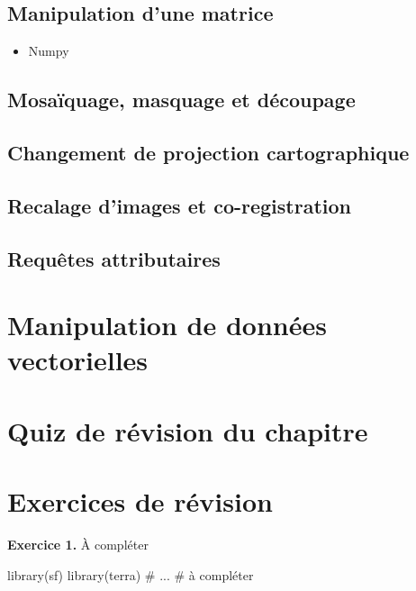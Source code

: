 \documentclass[
  letterpaper,
  DIV=11,
  numbers=noendperiod]{scrreprt}
\newenvironment{Shaded}{\begin{snugshade}}{\end{snugshade}}
\newcommand{\CommentTok}[1]{\textcolor[rgb]{0.37,0.37,0.37}{#1}}
\newcommand{\NormalTok}[1]{\textcolor[rgb]{0.00,0.23,0.31}{#1}}
\providecommand{\tightlist}{%
  \setlength{\itemsep}{0pt}\setlength{\parskip}{0pt}}\usepackage{longtable,booktabs,array}
\begin{document}
\subsection{Manipulation d'une matrice}\label{sec-0131}

\begin{itemize}
\tightlist
\item
  Numpy
\end{itemize}

\subsection{Mosaïquage, masquage et découpage}\label{sec-0132}

\subsection{Changement de projection cartographique}\label{sec-0133}

\subsection{Recalage d'images et co-registration}\label{sec-0134}

\subsection{Requêtes attributaires}\label{sec-0135}

\section{Manipulation de données vectorielles}\label{sec-014}

\section{Quiz de révision du chapitre}\label{sec-015}

\section{Exercices de révision}\label{sec-016}

\textbf{Exercice 1.} À compléter

\begin{Shaded}
\begin{Highlighting}[]
\NormalTok{library(sf)}
\NormalTok{library(terra)}
\CommentTok{\# ...}
\CommentTok{\# à compléter}
\end{Highlighting}
\end{Shaded}
\end{document}
